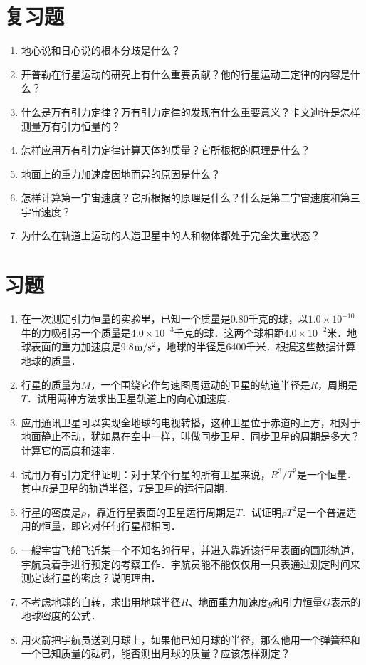 \section*{复习题}
\begin{enumerate}
	\item 地心说和日心说的根本分歧是什么？
	\item 开普勒在行星运动的研究上有什么重要贡献？他的行星运动三定律的内容是什么？
	\item 什么是万有引力定律？万有引力定律的发现有什么重要意义？卡文迪许是怎样测量万有引力恒量的？
	\item 怎样应用万有引力定律计算天体的质量？它所根据的原理是什么？
	\item 地面上的重力加速度因地而异的原因是什么？
	\item 怎样计算第一宇宙速度？它所根据的原理是什么？什么是第二宇宙速度和第三宇宙速度？
	\item 为什么在轨道上运动的人造卫星中的人和物体都处于完全失重状态？
\end{enumerate}

\section*{习题}
\begin{enumerate}
	\item 在一次测定引力恒量的实验里，已知一个质量是0.80千克的球，以$1.0\times 10^{-10}$牛的力吸引另一个质量是$4.0\times 10^{-3}$千克的球．这两个球相距$4.0\times 10^{-2}$米．地球表面的重力加速度是9.8$\text{m}/\text{s}^2$，地球的半径是6400千米．根据这些数据计算地球的质量．
	\item 行星的质量为$M$，一个围绕它作匀速图周运动的卫星的轨道半径是$R$，周期是$T$．试用两种方法求出卫星轨道上的向心加速度．	
	\item 应用通讯卫星可以实现全地球的电视转播，这种卫星位于赤道的上方，相对于地面静止不动，犹如悬在空中一样，叫做同步卫星．同步卫星的周期是多大？计算它的高度和速率．
	\item 试用万有引力定律证明：对于某个行星的所有卫星来说，$R^3/T^2$是一个恒量．其中$R$是卫星的轨道半径，$T$是卫星的运行周期．
	\item 行星的密度是$\rho$，靠近行星表面的卫星运行周期是$T$．试证明$\rho T^2$是一个普遍适用的恒量，即它对任何行星都相同．
	\item 一艘宇宙飞船飞近某一个不知名的行星，并进入靠近该行星表面的圆形轨道，宇航员着手进行预定的考察工作．宇航员能不能仅仅用一只表通过测定时间来测定该行星的密度？说明理由．
	\item 不考虑地球的自转，求出用地球半径$R$、地面重力加速度$g$和引力恒量$G$表示的地球密度的公式．
	\item 用火箭把宇航员送到月球上，如果他已知月球的半径，那么他用一个弹簧秤和一个已知质量的砝码，能否测出月球的质量？应该怎样测定？	


\end{enumerate}
	
